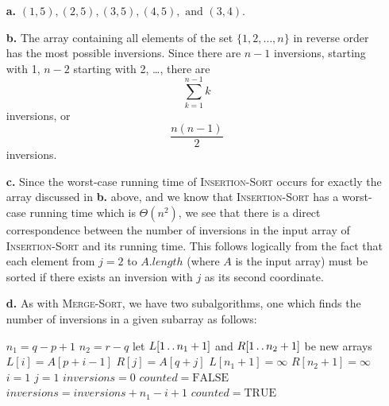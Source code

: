 
\begin{itemize}
    \item[\textbf{a.}]$(1, 5), (2, 5), (3, 5), (4, 5), \text{ and } (3, 4)$.
    \item[\textbf{b.}] The array containing all elements of the set 
        $\lbrace 1, 2, \ldots, n \rbrace$ in reverse order has the most 
        possible inversions. Since there are $n - 1$ inversions, starting with 
        1, $n - 2$ starting with 2, \ldots, there are
        \[
            \sum_{k=1}^{n-1} k
        \]
        inversions, or
        \[
            \frac{n(n - 1)}{2}
        \]
        inversions.
    \item[\textbf{c.}] Since the worst-case running time of \textsc{Insertion-Sort}
        occurs for exactly the array discussed in \textbf{b.} above, and we know that
        \textsc{Insertion-Sort} has a worst-case running time which is $\Theta(n^2)$,
        we see that there is a direct correspondence between the number of inversions
        in the input array of \textsc{Insertion-Sort} and its running time. This
        follows logically from the fact that each element from $j = 2$ to 
        $A.\mathit{length}$ (where $A$ is the input array) must be sorted if there
        exists an inversion with $j$ as its second coordinate.
    \item[\textbf{d.}] As with \textsc{Merge-Sort}, we have two subalgorithms, one 
        which finds the number of inversions in a given subarray as follows:
        \begin{algorithmic}[1]
            \STATE $n_1 = q - p + 1$
            \STATE $n_2 = r - q$
            \STATE let $L[1\mathinner{{\ldotp}\,{\ldotp}} n_1 + 1]$ and $R[1\mathinner{{\ldotp}\,{\ldotp}} n_2 + 1]$ be new arrays
                \STATE $L[i] = A[p + i - 1]$
            \ENDFOR
                \STATE $R[j] = A[q + j]$
            \ENDFOR
            \STATE $L[n_1 + 1] = \infty$
            \STATE $R[n_2 + 1] = \infty$
            \STATE $i = 1$
            \STATE $j = 1$
            \STATE $\mathit{inversions} = 0$
            \STATE $\mathit{counted} = \textrm{FALSE}$
                    \STATE $\mathit{inversions} = \mathit{inversions} + n_1 - i + 1$
                    \STATE $\mathit{counted} = \textrm{TRUE}$
                \ENDIF


\end{algorithmic}
\end{itemize}
